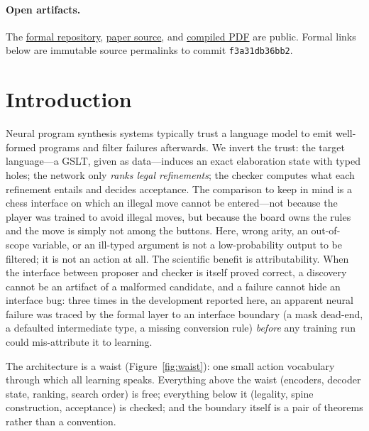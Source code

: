 \documentclass[11pt]{article}
\newcommand{\code}[1]{\texttt{#1}}
\newcommand{\formalshort}{f3a31db36bb2}
\begin{document}
\paragraph{Open artifacts.}
The \href{https://github.com/zariuq/MeTTapedia}{formal repository},
\href{https://github.com/zariuq/MeTTapedia/blob/main/papers/gslt2gslt.tex}{paper source},
and
\href{https://github.com/zariuq/MeTTapedia/blob/main/papers/gslt2gslt.pdf}{compiled PDF}
are public. Formal links below are immutable source permalinks to commit
\code{\formalshort}.

\section{Introduction}
\label{sec:intro}

Neural program synthesis systems typically trust a language model to emit well-formed
programs and filter failures afterwards. We invert the trust: the target language---a
GSLT, given as data---induces an exact elaboration state with typed holes; the network
only \emph{ranks legal refinements}; the checker computes what each refinement entails
and decides acceptance. The comparison to keep in mind is a chess interface on which an
illegal move cannot be entered---not because the player was trained to avoid illegal
moves, but because the board owns the rules and the move is simply not among the
buttons. Here, wrong arity, an out-of-scope variable, or an ill-typed argument is not a
low-probability output to be filtered; it is not an action at all. The scientific benefit is attributability. When the interface
between proposer and checker is itself proved correct, a discovery cannot be an artifact
of a malformed candidate, and a failure cannot hide an interface bug: three times in the
development reported here, an apparent neural failure was traced by the formal layer to
an interface boundary (a mask dead-end, a defaulted intermediate type, a missing
conversion rule) \emph{before} any training run could mis-attribute it to learning.

The architecture is a waist (Figure~\ref{fig:waist}): one small action vocabulary through
which all learning speaks. Everything above the waist (encoders, decoder state, ranking,
search order) is free; everything below it (legality, spine construction, acceptance) is
checked; and the boundary itself is a pair of theorems rather than a convention.
\end{document}
